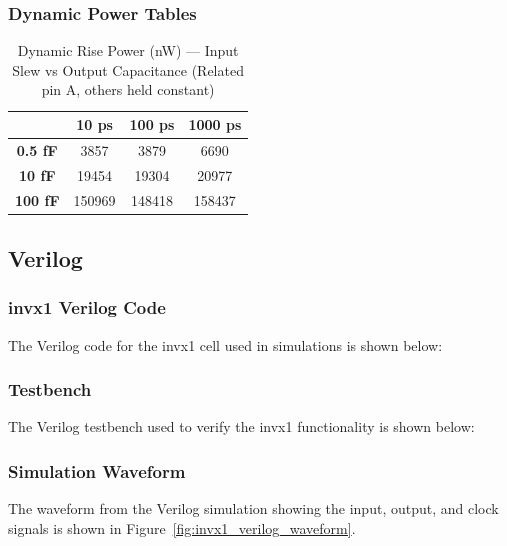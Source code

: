 \documentclass[12pt]{article}
\begin{document}
\subsubsection{Dynamic Power Tables}

\begin{table}[H]
	\centering
	\begin{tabular}{|c|c|c|c|}
		\hline
		                & \textbf{10 ps} & \textbf{100 ps} & \textbf{1000 ps} \\
		\hline
		\textbf{0.5 fF} & 3857           & 3879            & 6690             \\
		\hline
		\textbf{10 fF}  & 19454          & 19304           & 20977            \\
		\hline
		\textbf{100 fF} & 150969         & 148418          & 158437           \\
		\hline
	\end{tabular}
	\caption{Dynamic Rise Power (nW) — Input Slew vs Output Capacitance (Related pin A, others held constant)}
\end{table}

\subsection{Verilog}

\subsubsection{invx1 Verilog Code}
The Verilog code for the invx1 cell used in simulations is shown below:



\subsubsection{Testbench}
The Verilog testbench used to verify the invx1 functionality is shown below:



\subsubsection{Simulation Waveform}
The waveform from the Verilog simulation showing the input, output, and clock signals is shown in Figure~\ref{fig:invx1_verilog_waveform}.
\end{document}
